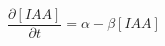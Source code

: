 \documentclass[a4paper,11pt]{article}
\begin{document}
$$
\frac{\partial [IAA]}{\partial t} = \alpha - \beta [IAA]
$$
\end{document}
